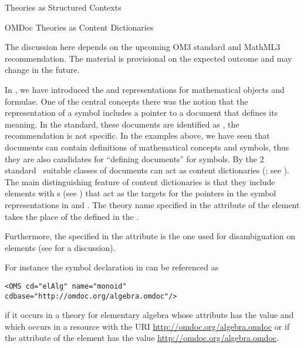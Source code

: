 \begin{omgroup}[short=Mathematical Statements,id=statements]
\begin{omgroup}[id=theories-contexts]{Theories as Structured Contexts}
\begin{module}[id=theories]
\begin{omgroup}[id=identifying]{OMDoc Theories as Content Dictionaries}
\begin{oldpart}{The discussion here depends on the upcoming OM3 standard and MathML3
    recommendation. The material is provisional on the expected outcome and may change in
    the future.}
\begin{omtext}
  In {}, we have introduced the {\openmath} and {\cmathml} representations for
  mathematical objects and formulae. One of the central concepts there was the notion that
  the representation of a symbol includes a pointer to a document that defines its
  meaning.  In the {\openmath} standard, these documents are identified as
  , the
  {\mathml} recommendation is not specific.  In the examples above, we have seen that
  {\omdoc} documents can contain definitions of mathematical concepts and symbols, thus
  they are also candidates for ``defining documents'' for symbols.  By the {\openmath}2
  standard~\cite{BusCapCar:2oms04} suitable classes of {\omdoc} documents can act as
  {\openmath} content dictionaries (; see {}).  The main
  distinguishing feature of {\omdoc} content dictionaries is that they include
  {} elements with {s} (see
  {}) that act as the targets for the pointers in the symbol
  representations in {\openmath} and {\cmathml}. The theory name specified in the
  {} attribute of the {} element takes
  the place of the {} defined in the .
\end{omtext}

Furthermore, the {} specified in the {} attribute
is the one used for disambiguation on {} elements (see
{} for a discussion).
  
For instance the symbol declaration in {} can be referenced as
\begin{lstlisting}
<OMS cd="elAlg" name="monoid" cdbase="http://omdoc.org/algebra.omdoc"/>
\end{lstlisting}
if it occurs in a theory for elementary algebra whose
{} attribute has the value {} and which
occurs in a resource with the URI \url{http://omdoc.org/algebra.omdoc} or if the
{} attribute of the {} element has the value
\url{http://omdoc.org/algebra.omdoc}.


\end{oldpart}
\end{omgroup}
\end{module}
\end{omgroup}
\end{omgroup}
